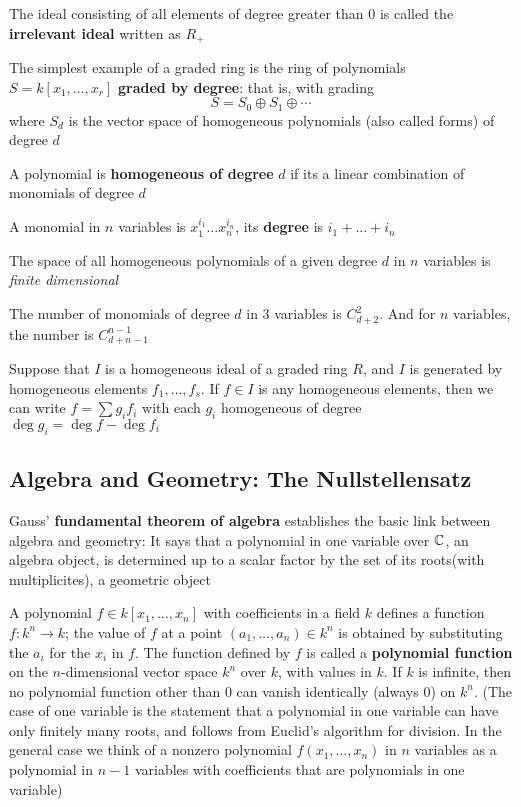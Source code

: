 \documentclass[11pt]{article}
\begin{document}
The ideal consisting of all elements of degree greater than 0 is called the
\textbf{irrelevant ideal} written as \(R_+\)

The simplest example of a graded ring is the ring of polynomials
\(S=k[x_1,\dots,x_r]\) \textbf{graded by degree}: that is, with grading
\begin{equation*}
S=S_0\oplus S_1\oplus\cdots
\end{equation*}
where \(S_d\) is the vector space of homogeneous polynomials (also called
forms) of degree \(d\)

\begin{definition}[]
A polynomial is \textbf{homogeneous of degree} \(d\) if its a linear combination of
monomials of degree \(d\)

A monomial in \(n\) variables is \(x_1^{i_1}\dots x_n^{i_n}\), its \textbf{degree} is \(i_1+\dots+i_n\)
\end{definition}

The space of all homogeneous polynomials of a given degree \(d\) in \(n\)
variables is \emph{finite dimensional}

\begin{proposition}[]
The number of monomials of degree \(d\) in 3 variables is \(C_{d+2}^2\). And
for \(n\) variables, the number is \(C_{d+n-1}^{n-1}\)
\end{proposition}

Suppose that \(I\) is a homogeneous ideal of a graded ring \(R\), and \(I\)
is generated by homogeneous elements \(f_1,\dots,f_s\). If \(f\in I\) is any
homogeneous elements, then we can write \(f=\sum g_if_i\) with each \(g_i\)
homogeneous of degree \(\deg g_i=\deg f-\deg f_i\)
\subsection{Algebra and Geometry: The Nullstellensatz}
\label{sec:org3c408cf}
Gauss' \textbf{fundamental theorem of algebra} establishes the basic link between
algebra and geometry: It says that a polynomial in one variable over \(\mathbb{C}\),
an algebra object, is determined up to a scalar factor by the set of its
roots(with multiplicites), a geometric object

A polynomial \(f\in k[x_1,\dots,x_n]\) with coefficients in a field \(k\)
defines a function \(f:k^n\to k\); the value of \(f\) at a point
\((a_1,\dots,a_n)\in k^n\) is obtained by substituting the \(a_i\) for the
\(x_i\) in \(f\). The function defined by \(f\) is called a \textbf{polynomial
function} on the \(n\)-dimensional vector space \(k^n\) over \(k\), with
values in \(k\). If \(k\) is infinite, then no polynomial function other than
0 can vanish identically (always 0) on \(k^n\). (The case of one variable is
the statement that a polynomial in one variable can have only finitely many
roots, and follows from Euclid's algorithm for division. In the general case
we think of a nonzero polynomial \(f(x_1,\dots,x_n)\) in \(n\) variables as a
polynomial in \(n-1\) variables with coefficients that are polynomials in one
variable)
\end{document}
